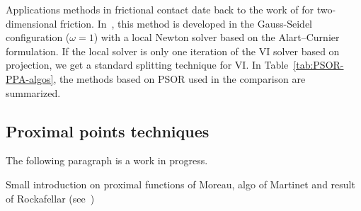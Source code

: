 Applications methods in frictional contact date back to the work of \cite{Mitsopoulou.Doudoumis1988,Mitsopoulou.Doudoumis1987} for two-dimensional friction. In~\cite{Jourdan.Alart.ea98}, this method is developed in the Gauss-Seidel configuration ($\omega=1$) with a local Newton solver based on the Alart--Curnier formulation. If the local solver is only one iteration of the VI solver based on projection, we get a standard splitting technique for VI. In Table~\ref{tab:PSOR-PPA-algos}, the methods based on PSOR used in the comparison are summarized.

\subsection{Proximal points techniques}\label{Sec:Prox}

\begin{ndroh}
 The following paragraph is a work in progress.
\end{ndroh}


\begin{ndrva}

  Small introduction on proximal functions of Moreau, algo of Martinet
  and result of Rockafellar (see~\cite{Chen.Teboublle_SIOPT1993})
\end{ndrva}

